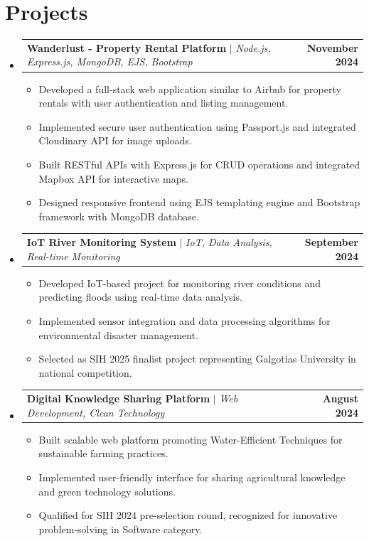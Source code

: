 \documentclass[letterpaper,11pt]{article}
\makeatletter
\newcommand{\resumeItem}[1]{
  \item\small{
    {#1 \vspace{-2pt}}
  }
}
\newcommand{\resumeProjectHeading}[2]{
    \item
    \begin{tabular*}{1.001\textwidth}{l@{\extracolsep{\fill}}r}
      \small#1 & \textbf{\small #2}\\
    \end{tabular*}\vspace{-7pt}
}
\newcommand{\resumeSubHeadingListStart}{\begin{itemize}[leftmargin=0.0in, label={}]}
\newcommand{\resumeSubHeadingListEnd}{\end{itemize}}
\newcommand{\resumeItemListStart}{\begin{itemize}}
\newcommand{\resumeItemListEnd}{\end{itemize}\vspace{-5pt}}
\makeatother
\begin{document}
\section{Projects}
    \vspace{-5pt}
    \resumeSubHeadingListStart
      \resumeProjectHeading
          {\textbf{Wanderlust - Property Rental Platform} $|$ \emph{Node.js, Express.js, MongoDB, EJS, Bootstrap}}{November 2024}
          \resumeItemListStart
            \resumeItem{Developed a full-stack web application similar to Airbnb for property rentals with user authentication and listing management.}
            \resumeItem{Implemented secure user authentication using Passport.js and integrated Cloudinary API for image uploads.}
            \resumeItem{Built RESTful APIs with Express.js for CRUD operations and integrated Mapbox API for interactive maps.}
            \resumeItem{Designed responsive frontend using EJS templating engine and Bootstrap framework with MongoDB database.}
          \resumeItemListEnd
          \vspace{-13pt}
      \resumeProjectHeading
          {\textbf{IoT River Monitoring System} $|$ \emph{IoT, Data Analysis, Real-time Monitoring}}{September 2024}
          \resumeItemListStart
            \resumeItem{Developed IoT-based project for monitoring river conditions and predicting floods using real-time data analysis.}
            \resumeItem{Implemented sensor integration and data processing algorithms for environmental disaster management.}
            \resumeItem{Selected as SIH 2025 finalist project representing Galgotias University in national competition.}
          \resumeItemListEnd
          \vspace{-13pt}
      \resumeProjectHeading
          {\textbf{Digital Knowledge Sharing Platform} $|$ \emph{Web Development, Clean Technology}}{August 2024}
          \resumeItemListStart
            \resumeItem{Built scalable web platform promoting Water-Efficient Techniques for sustainable farming practices.}
            \resumeItem{Implemented user-friendly interface for sharing agricultural knowledge and green technology solutions.}
            \resumeItem{Qualified for SIH 2024 pre-selection round, recognized for innovative problem-solving in Software category.}
          \resumeItemListEnd
    \resumeSubHeadingListEnd
\vspace{-15pt}

\end{document}
